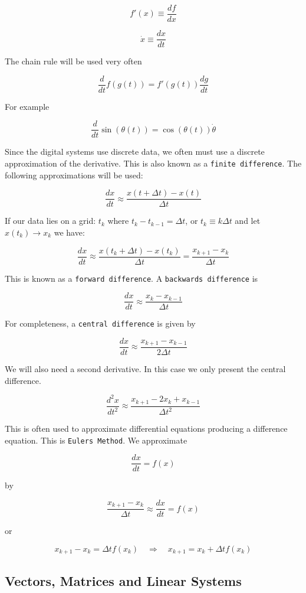 \[f'(x) \equiv \displaystyle \frac{df}{dx}\]

\[\dot{x} \equiv \displaystyle \frac{dx}{dt}\]

The chain rule will be used very often

\[\displaystyle \frac{d}{dt} f(g(t))  = f'(g(t)) \frac{dg}{dt}\]

For example

\[\displaystyle \frac{d}{dt} \sin(\theta(t))  = \cos(\theta(t)) \dot{\theta}\]

Since the digital systems use discrete data, we often must use a
discrete approximation of the derivative. This is also known as a
\texttt{finite\ difference}. The following approximations will be used:

\[\frac{dx}{dt} \approx \frac{x(t+\Delta t) - x(t)}{\Delta t}\]

If our data lies on a grid: \(t_k\) where \(t_k - t_{k-1} = \Delta t\),
or \(t_k \equiv k\Delta t\) and let \(x(t_k) \to x_k\) we have:

\[\frac{dx}{dt} \approx \frac{x(t_k+\Delta t) - x(t_k)}{\Delta t} = \frac{x_{k+1} - x_k}{\Delta t}\]

This is known as a \texttt{forward\ difference}. A
\texttt{backwards\ difference} is

\[\frac{dx}{dt} \approx \frac{x_{k} - x_{k-1}}{\Delta t}\]

For completeness, a \texttt{central\ difference} is given by

\[\frac{dx}{dt} \approx \frac{x_{k+1} - x_{k-1}}{2\Delta t}\]

We will also need a second derivative. In this case we only present the
central difference.

\[\frac{d^2x}{dt^2} \approx \frac{x_{k+1} -2x_k + x_{k-1}}{\Delta t^2}\]

This is often used to approximate differential equations producing a
difference equation. This is \texttt{Euler\textquotesingle{}s\ Method}.
We approximate

\[\frac{dx}{dt} = f(x)\]

by

\[\frac{x_{k+1} - x_k}{\Delta t} \approx \frac{dx}{dt} = f(x)\]

or

\[x_{k+1} - x_k = \Delta t f(x_k) \quad\Rightarrow\quad x_{k+1} = x_k + \Delta t f(x_k)\]

\hypertarget{vectors-matrices-and-linear-systems}{%
\subsection{Vectors, Matrices and Linear
Systems}\label{vectors-matrices-and-linear-systems}}

